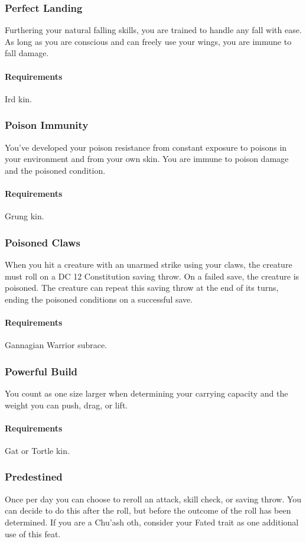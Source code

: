 \subsubsection{Perfect Landing} \label{feat::perfectlanding}
    Furthering your natural falling skills, you are trained to handle any fall with ease.
    As long as you are conscious and can freely use your wings, you are immune to fall damage.
    \paragraph{Requirements} Ird kin.
\subsubsection{Poison Immunity} \label{feat::poisonimmunity}
    You've developed your poison resistance from constant exposure to poisons in your environment and from your own skin.
    You are immune to poison damage and the poisoned condition.
    \paragraph{Requirements} Grung kin.
\subsubsection{Poisoned Claws} \label{feat::poisonedclaws}
    When you hit a creature with an unarmed strike using your claws, the creature must roll on a DC 12 Constitution saving throw.
    On a failed save, the creature is poisoned.
    The creature can repeat this saving throw at the end of its turns, ending the poisoned conditions on a successful save.
    \paragraph{Requirements} Gannagian Warrior subrace.
\subsubsection{Powerful Build} \label{feat::powerfulbuild_kin}
    You count as one size larger when determining your carrying capacity and the weight you can push, drag, or lift.
    \paragraph{Requirements} Gat or Tortle kin.
\subsubsection{Predestined} \label{feat::predenstined}
    Once per day you can choose to reroll an attack, skill check, or saving throw.
    You can decide to do this after the roll, but before the outcome of the roll has been determined.
    If you are a Chu'ash oth, consider your Fated trait as one additional use of this feat.

